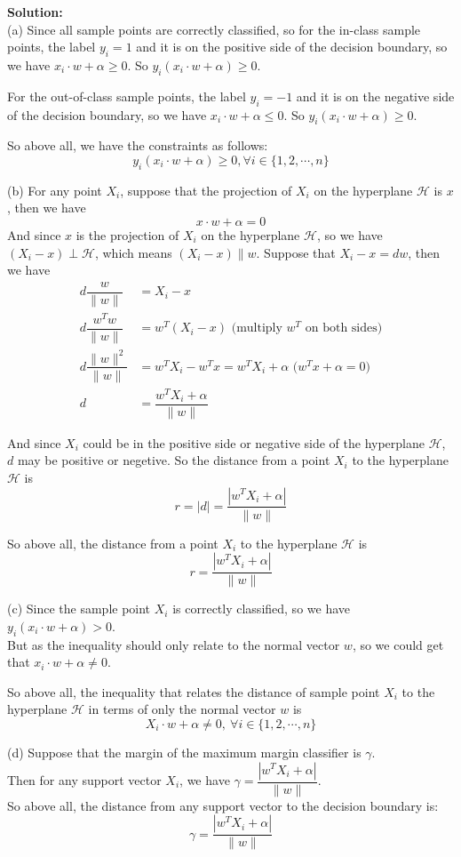 \documentclass[10pt]{article}
\begin{document}
\begin{enumerate}[1.]
\textbf{Solution:}\\
(a) Since all sample points are correctly classified, so for the in-class sample points, the label $y_i=1$ and it is on the 
positive side of the decision boundary, so we have $x_i\cdot w+\alpha\geq 0$. So $y_i(x_i\cdot w+\alpha)\geq 0$.

For the out-of-class sample points, the label $y_i=-1$ and it is on the negative side of the decision boundary, so we have $x_i\cdot w+\alpha\leq 0$.
So $y_i(x_i\cdot w+\alpha)\geq 0$.

So above all, we have the constraints as follows:
$$y_i(x_i\cdot w+\alpha)\geq 0, \forall i\in\{1,2,\cdots,n\}$$

(b) For any point $X_i$, suppose that the projection of $X_i$ on the hyperplane $\mathcal{H}$ is $x$, then we have
$$x\cdot w+\alpha=0$$
And since $x$ is the projection of $X_i$ on the hyperplane $\mathcal{H}$, so we have $(X_i-x)\perp \mathcal{H}$, which means
$(X_i-x) \parallel w$. Suppose that $X_i-x=d w$, then we have
\begin{align*}
  d \dfrac{w}{\|w\|}&=X_i - x \\
  d \dfrac{w^Tw}{\|w\|}&=w^T(X_i - x)  \text{ (multiply $w^T$ on both sides)} \\
  d \dfrac{\|w\|^2}{\|w\|}&=w^TX_i - w^Tx = w^TX_i + \alpha \text{ ($w^Tx+\alpha=0$)} \\
  d &= \dfrac{w^TX_i + \alpha}{\|w\|}
\end{align*}

And since $X_i$ could be in the positive side or negative side of the hyperplane $\mathcal{H}$, $d$ may be positive or negetive.
So the distance from a point $X_i$ to the hyperplane $\mathcal{H}$ is
$$r = |d| = \dfrac{|w^TX_i + \alpha|}{\|w\|}$$

So above all, the distance from a point $X_i$ to the hyperplane $\mathcal{H}$ is
$$r = \dfrac{|w^TX_i + \alpha|}{\|w\|}$$

(c) Since the sample point $X_i$ is correctly classified, so we have $y_i(x_i\cdot w+\alpha)> 0$.\\
But as the inequality should only relate to the normal vector $w$, so we could get that $x_i\cdot w+\alpha\neq 0$.

So above all, the inequality that relates the distance of sample point $X_i$ to the hyperplane $\mathcal{H}$ in terms of only the normal vector $w$ is
$$X_i\cdot w+\alpha\neq 0,\ \forall i\in\{1,2,\cdots,n\}$$

(d) Suppose that the margin of the maximum margin classifier is $\gamma$.\\
Then for any support vector $X_i$, we have $\gamma = \dfrac{|w^TX_i + \alpha|}{\|w\|}$.\\
So above all, the distance from any support vector to the decision boundary is:
$$\gamma = \dfrac{|w^TX_i + \alpha|}{\|w\|}$$


\end{enumerate}
\end{document}
